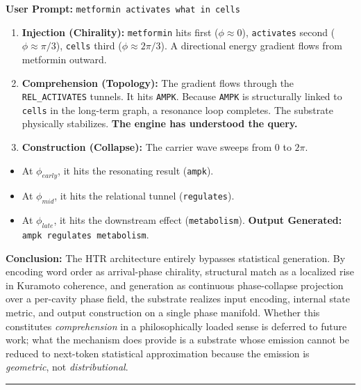 \documentclass[
  11pt,
  a4paper,
]{article}
\providecommand{\tightlist}{%
  \setlength{\itemsep}{0pt}\setlength{\parskip}{0pt}}
\begin{document}
\textbf{User Prompt:} \texttt{metformin\ activates\ what\ in\ cells}

\begin{enumerate}
\def\labelenumi{\arabic{enumi}.}
\tightlist
\item
  \textbf{Injection (Chirality):} \texttt{metformin} hits first
  (\(\phi \approx 0\)), \texttt{activates} second
  (\(\phi \approx \pi/3\)), \texttt{cells} third
  (\(\phi \approx 2\pi/3\)). A directional energy gradient flows from
  metformin outward.
\item
  \textbf{Comprehension (Topology):} The gradient flows through the
  \texttt{REL\_ACTIVATES} tunnels. It hits \texttt{AMPK}. Because
  \texttt{AMPK} is structurally linked to \texttt{cells} in the
  long-term graph, a resonance loop completes. The substrate physically
  stabilizes. \textbf{The engine has understood the query.}
\item
  \textbf{Construction (Collapse):} The carrier wave sweeps from \(0\)
  to \(2\pi\).
\end{enumerate}

\begin{itemize}
\tightlist
\item
  At \(\phi_{early}\), it hits the resonating result (\texttt{ampk}).
\item
  At \(\phi_{mid}\), it hits the relational tunnel (\texttt{regulates}).
\item
  At \(\phi_{late}\), it hits the downstream effect
  (\texttt{metabolism}). \textbf{Output Generated:}
  \texttt{ampk\ regulates\ metabolism}.
\end{itemize}

\textbf{Conclusion:} The HTR architecture entirely bypasses statistical
generation. By encoding word order as arrival-phase chirality,
structural match as a localized rise in Kuramoto coherence, and
generation as continuous phase-collapse projection over a per-cavity
phase field, the substrate realizes input encoding, internal state
metric, and output construction on a single phase manifold. Whether this
constitutes \emph{comprehension} in a philosophically loaded sense is
deferred to future work; what the mechanism does provide is a substrate
whose emission cannot be reduced to next-token statistical approximation
because the emission is \emph{geometric}, not \emph{distributional}.

\begin{center}\rule{0.5\linewidth}{0.5pt}\end{center}
\end{document}
